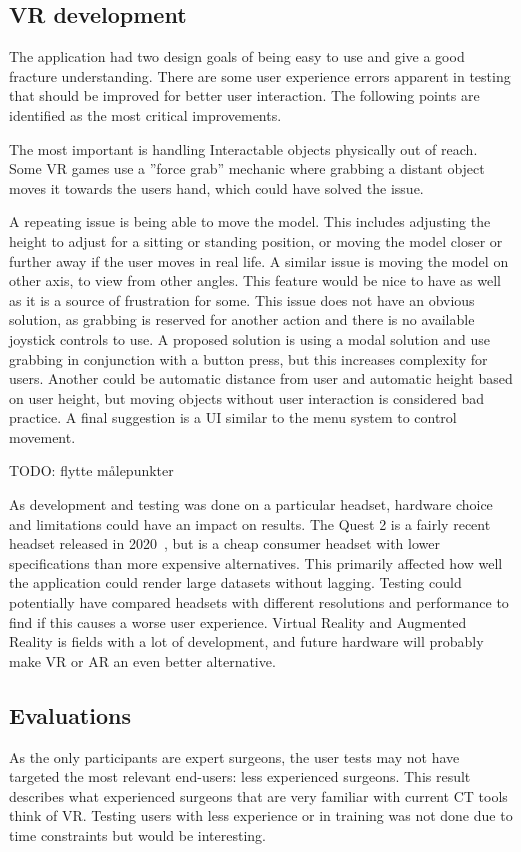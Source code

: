 \documentclass[a4paper]{report}
\begin{document}
\subsection{VR development}

The application had two design goals of being easy to use and give a good fracture understanding.
There are some user experience errors apparent in testing that should be improved for better user interaction. The following points are identified as the most critical improvements.

The most important is handling Interactable objects physically out of reach. Some VR games use a ''force grab'' mechanic where grabbing a distant object moves it towards the users hand, which could have solved the issue.

A repeating issue is being able to move the model. This includes adjusting the height to adjust for a sitting or standing position, or moving the model closer or further away if the user moves in real life. A similar issue is moving the model on other axis, to view from other angles. This feature would be nice to have as well as it is a source of frustration for some.
This issue does not have an obvious solution, as grabbing is reserved for another action and there is no available joystick controls to use. A proposed solution is using a modal solution and use grabbing in conjunction with a button press, but this increases complexity for users. Another could be automatic distance from user and automatic height based on user height, but moving objects without user interaction is considered bad practice. A final suggestion is a UI similar to the menu system to control movement.

TODO: flytte målepunkter


As development and testing was done on a particular headset, hardware choice and limitations could have an impact on results. The Quest 2 is a fairly recent headset released in 2020~\cite{noauthor_oculus_nodate}, but is a cheap consumer headset with lower specifications than more expensive alternatives. This primarily affected how well the application could render large datasets without lagging.
Testing could potentially have compared headsets with different resolutions and performance to find if this causes a worse user experience.
Virtual Reality and Augmented Reality is fields with a lot of development, and future hardware will probably make VR or AR an even better alternative.

\subsection{Evaluations}
As the only participants are expert surgeons, the user tests may not have targeted the most relevant end-users: less experienced surgeons. This result describes what experienced surgeons that are very familiar with current CT tools think of VR. Testing users with less experience or in training was not done due to time constraints but would be interesting.
\end{document}
